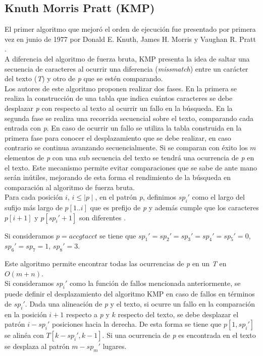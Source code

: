\subsection{Knuth Morris Pratt (KMP)}
\label{subsec:kmp}
El primer algoritmo que mejoró el orden de ejecución fue presentado por primera vez en junio de 1977 por Donald E. Knuth, James H. Morris y Vaughan R. Pratt \cite{KMP}.\\
A diferencia del algoritmo de fuerza bruta, KMP presenta la idea de saltar una secuencia de caracteres al ocurrir una diferencia ({\it missmatch}) entre un carácter del texto ({\it T}) y otro de {\it p} que se estén comparando.\\
Los autores de este algoritmo proponen realizar dos fases. En la primera se realiza la construcción de una tabla que indica cuántos caracteres se debe desplazar {\it p} con respecto al texto al ocurrir un fallo en la búsqueda. En la segunda fase se realiza una recorrida secuencial sobre el texto, comparando cada entrada con {\it p}. En caso de ocurrir un fallo se utiliza la tabla construida en la primera fase para conocer el desplazamiento que se debe realizar, en caso contrario se continua avanzando secuencialmente. Si se comparan con éxito los $m$ elementos de {\it p} con una sub secuencia del texto se tendrá una ocurrencia de {\it p} en el texto.
Este mecanismo permite evitar comparaciones que se sabe de ante mano serán inútiles, mejorando de esta forma el rendimiento de la búsqueda en comparación al algoritmo de fuerza bruta.\\
Para cada posición $i$, $i \leq \mid p \mid$, en el patrón {\it p}, definimos $sp_{i}'$ como el largo del sufijo más largo de $p[1..i]$ que es prefijo de {\it p} y además cumple que los caracteres $p[i+1]$ y $p[sp_{i}' + 1]$ son diferentes \cite{GUS}. 
\begin{example*}
Si consideramos $p = accgtacct$ se tiene que $sp_{1}' = sp_{2}' = sp_{3}' = sp_{4}' = sp_{5}' = 0$, $sp_{6}' = sp_{7} = 1$, $sp_{8}' = 3$.
\end{example*}
\myrule{}{}
Este algoritmo permite encontrar todas las ocurrencias de {\it p} en un {\it T} en $O(m+n)$.\\
Si consideramos $sp_{i}'$ como la función de fallos mencionada anteriormente, se puede definir el desplazamiento del algoritmo KMP en caso de fallos en términos de $sp_{i}'$. Dada una alineación de {\it p} y el texto, si ocurre un fallo en la comparación en la posición $i + 1$ respecto a {\it p} y $k$ respecto del texto, se debe desplazar el patrón $i - sp_{i}'$ posiciones hacia la derecha. De esta forma se tiene que $p[1,sp_{i}']$ se alinéa con $T[k-sp_{i}',k-1]$. Si una ocurrencia de {\it p} es encontrada en el texto se desplaza al patrón $m-sp_{m}'$ lugares.
